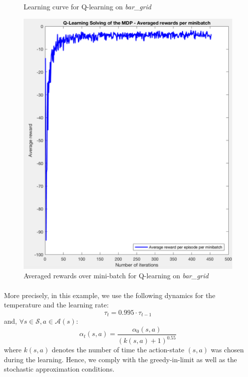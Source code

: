 \documentclass[a4paper]{report}
\begin{document}
{{{\begin{figure}[h!]
\begin{minipage}{0.4\linewidth}
						\caption{Learning curve for Q-learning on \emph{bar\_grid}}
						\label{fig::bargrid_ql_lc}
					\end{minipage}
					\hfill
					\begin{minipage}{0.4\linewidth}
						\includegraphics[width=0.9\linewidth]{bargrid_ql_averaged_rewards}
						\caption{Averaged rewards over mini-batch for Q-learning on \emph{bar\_grid}}
						\label{fig::bargrid_ql_ar}
					\end{minipage}
				\end{figure}
				\paragraph{} More precisely, in this example, we use the following dynamics for the temperature and the learning rate: 
				\begin{equation}
					\tau_t = 0.995\cdot\tau_{t-1}
				\end{equation}
				and, $\forall s \in\mathcal{S}, a\in\mathcal{A}(s)$:  
				\begin{equation}
					\alpha_t(s,a) = \frac{\alpha_0(s,a)}{(k(s,a)+1)^{0.55}}
				\end{equation}
				where $k(s,a)$ denotes the number of time the action-state $(s,a)$ was chosen during the learning. Hence, we comply with the greedy-in-limit as well as the stochastic approximation conditions. 
				  
}}}
\end{document}
